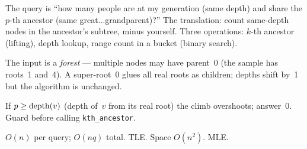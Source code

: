 \begin{attemptgate}
\end{attemptgate}

The query is ``how many people are at my generation (same depth) and
share the \(p\)-th ancestor (same great\(\ldots\)grandparent)?''  The
translation: count same-depth nodes in the ancestor's subtree, minus
yourself.  Three operations: \(k\)-th ancestor (lifting), depth lookup,
range count in a bucket (binary search).

\begin{observation}
The input is a \emph{forest} --- multiple nodes may have parent~0 (the
sample has roots~1 and~4).  A super-root~0 glues all real roots as
children; depths shift by~1 but the algorithm is unchanged.
\end{observation}
\begin{observation}
If $p \ge \operatorname{depth}(v)$ (depth of~$v$ from its real root) the climb
overshoots; answer~0.  Guard before calling \texttt{kth\_ancestor}.
\end{observation}

\begin{thinkbox}
{\(O(n)\) per query; \(O(nq)\) total.  TLE.}
{Space \(O(n^2)\).  MLE.}
\end{thinkbox}

